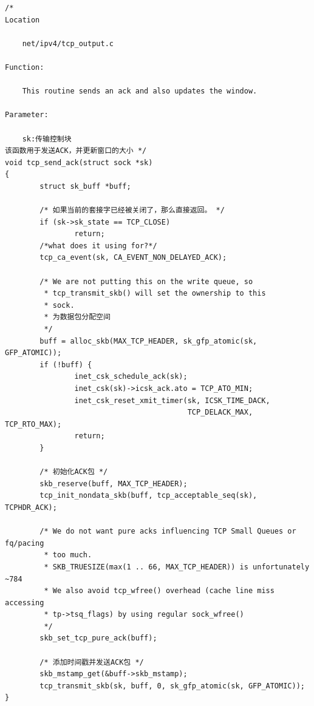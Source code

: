 \begin{verbatim}
/* 
Location

    net/ipv4/tcp_output.c

Function:

    This routine sends an ack and also updates the window.

Parameter:

    sk:传输控制块
该函数用于发送ACK，并更新窗口的大小 */
void tcp_send_ack(struct sock *sk)
{
        struct sk_buff *buff;

        /* 如果当前的套接字已经被关闭了，那么直接返回。 */
        if (sk->sk_state == TCP_CLOSE)
                return;
        /*what does it using for?*/
        tcp_ca_event(sk, CA_EVENT_NON_DELAYED_ACK);

        /* We are not putting this on the write queue, so
         * tcp_transmit_skb() will set the ownership to this
         * sock.
         * 为数据包分配空间
         */
        buff = alloc_skb(MAX_TCP_HEADER, sk_gfp_atomic(sk, GFP_ATOMIC));
        if (!buff) {
                inet_csk_schedule_ack(sk);
                inet_csk(sk)->icsk_ack.ato = TCP_ATO_MIN;
                inet_csk_reset_xmit_timer(sk, ICSK_TIME_DACK,
                                          TCP_DELACK_MAX, TCP_RTO_MAX);
                return;
        }

        /* 初始化ACK包 */
        skb_reserve(buff, MAX_TCP_HEADER);
        tcp_init_nondata_skb(buff, tcp_acceptable_seq(sk), TCPHDR_ACK);

        /* We do not want pure acks influencing TCP Small Queues or fq/pacing
         * too much.
         * SKB_TRUESIZE(max(1 .. 66, MAX_TCP_HEADER)) is unfortunately ~784
         * We also avoid tcp_wfree() overhead (cache line miss accessing
         * tp->tsq_flags) by using regular sock_wfree()
         */
        skb_set_tcp_pure_ack(buff);

        /* 添加时间戳并发送ACK包 */
        skb_mstamp_get(&buff->skb_mstamp);
        tcp_transmit_skb(sk, buff, 0, sk_gfp_atomic(sk, GFP_ATOMIC));
}
\end{verbatim}


